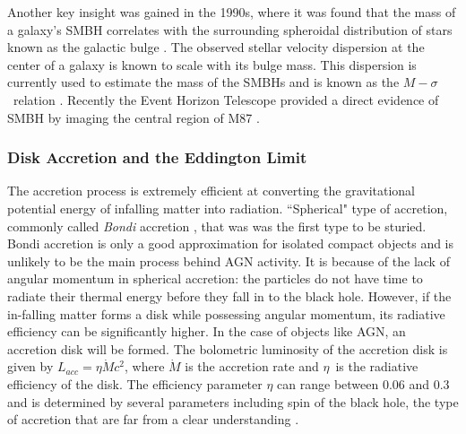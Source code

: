 Another key insight was gained in the 1990s, where it was found that the mass of a galaxy's SMBH correlates with the surrounding spheroidal distribution of stars known as the galactic bulge \citep{magorrian1998demography}. The observed stellar velocity dispersion at the center of a galaxy is known to scale with its bulge mass. This dispersion is currently used to estimate the mass of the SMBHs and is known as the $M-\sigma$~relation
\citep{ferrarese2000fundamental,gebhardt2000relationship}. Recently the Event Horizon Telescope provided a direct evidence of SMBH by imaging the central region of M87 \citep{2019ApJ...875L...1E}.
\subsubsection{Disk Accretion and the Eddington Limit\label{subsec:accretion}}
The accretion process is extremely efficient at converting the gravitational potential energy of infalling matter into radiation. ``Spherical" type of accretion, commonly called \textit{Bondi} accretion \citep{bondi1952spherically},  that was was the first type to be sturied. Bondi accretion is only a good approximation for isolated compact objects and is unlikely to be the main process behind AGN activity. It is because of the lack of angular momentum in spherical accretion: the particles do not have time to radiate their thermal energy before they fall in to the black hole. However, if the in-falling matter forms a disk while possessing angular momentum, its radiative efficiency can be significantly higher. In the case of objects like AGN, an accretion disk will be formed.  The bolometric luminosity of the accretion disk is given by $L_{acc}=\eta\dot{M}c^2$, where $\dot{M}$ is the accretion rate and $\eta$~is the radiative efficiency of the disk. The efficiency parameter $\eta$ can range between 0.06 and 0.3 and is determined by several parameters including spin of the black hole, the type of accretion that are far from a clear understanding \citep{raimundo2009eddington}.

